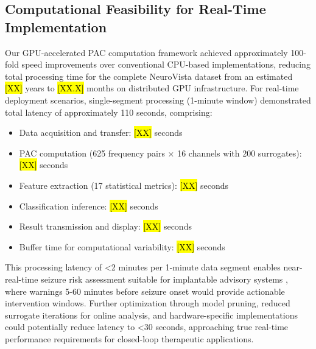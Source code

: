 


\subsection{Computational Feasibility for Real-Time Implementation}
Our GPU-accelerated PAC computation framework \cite{Combrisson2020TensorpacAOAH} achieved approximately 100-fold speed improvements over conventional CPU-based implementations, reducing total processing time for the complete NeuroVista dataset from an estimated \hl{[XX]} years to \hl{[XX.X]} months on distributed GPU infrastructure. For real-time deployment scenarios, single-segment processing (1-minute window) demonstrated total latency of approximately 110 seconds, comprising:
\begin{itemize}
\item Data acquisition and transfer: \hl{[XX]} seconds
\item PAC computation (625 frequency pairs × 16 channels with 200 surrogates): \hl{[XX]} seconds
\item Feature extraction (17 statistical metrics): \hl{[XX]} seconds
\item Classification inference: \hl{[XX]} seconds
\item Result transmission and display: \hl{[XX]} seconds
\item Buffer time for computational variability: \hl{[XX]} seconds
\end{itemize}

This processing latency of <2 minutes per 1-minute data segment enables near-real-time seizure risk assessment suitable for implantable advisory systems \cite{Kuhlmann2018SeizurePA}, where warnings 5-60 minutes before seizure onset would provide actionable intervention windows. Further optimization through model pruning, reduced surrogate iterations for online analysis, and hardware-specific implementations could potentially reduce latency to <30 seconds, approaching true real-time performance requirements for closed-loop therapeutic applications.

